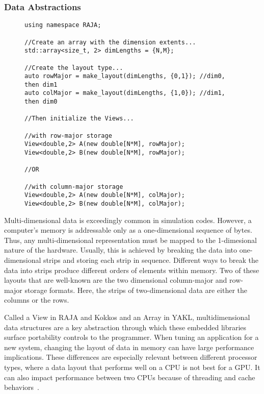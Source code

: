 \subsubsection{Data Abstractions}
\begin{figure}
\begin{lstlisting}[caption={Data declaration using RAJA multi-dimensional data abstractions, called Views. Changing a View's layout only requires changing the second argument in its constructor.}, label=stencilData]
using namespace RAJA;

//Create an array with the dimension extents...
std::array<size_t, 2> dimLengths = {N,M};

//Create the layout type...
auto rowMajor = make_layout(dimLengths, {0,1}); //dim0, then dim1
auto colMajor = make_layout(dimLengths, {1,0}); //dim1, then dim0

//Then initialize the Views...

//with row-major storage
View<double,2> A(new double[N*M], rowMajor);
View<double,2> B(new double[N*M], rowMajor);

//OR

//with column-major storage
View<double,2> A(new double[N*M], colMajor);
View<double,2> B(new double[N*M], colMajor);
\end{lstlisting}
\end{figure}

Multi-dimensional data is exceedingly common in simulation codes.
However, a computer's memory is addressable only as a one-dimensional sequence of bytes.
Thus, any multi-dimensional representation must be mapped to the 1-dimesional nature of the hardware.
Usually, this is achieved by breaking the data into one-dimensional strips and storing each strip in sequence.
Different ways to break the data into strips produce different orders of elements within memory.
Two of these layouts that are well-known are the two dimensional column-major and row-major storage formats.
Here, the strips of two-dimensional data are either the columns or the rows.

Called a View in RAJA and Kokkos and an Array in YAKL, multidimensional data structures are a key abstraction through which these embedded libraries surface portability controls to the programmer.
When tuning an application for a new system, changing the layout of data in memory can have large performance implications.
These differences are especially relevant between different processor types, where a data layout that performs well on a CPU is not best for a GPU\@.
It can also impact performance between two CPUs because of threading and cache behaviors~\cite{trott2021kokkos}.


